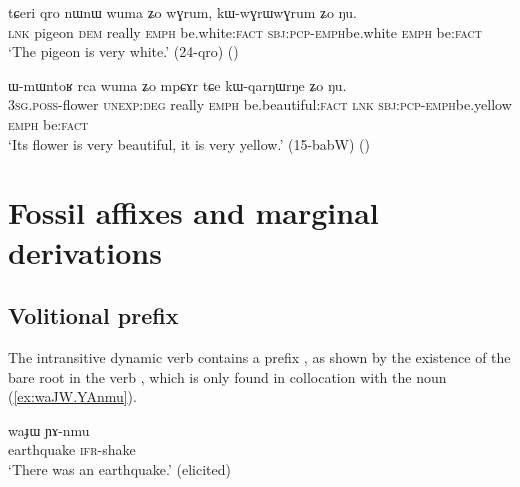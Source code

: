 \begin{exe}
\ex \label{ex:kWwGrWwGrum}
\gll  tɕeri qro nɯnɯ wuma ʑo wɣrum, kɯ-wɣrɯ\redp{}wɣrum ʑo ŋu. \\
\textsc{lnk} pigeon \textsc{dem} really \textsc{emph} be.white:\textsc{fact} \textsc{sbj}:\textsc{pcp}-\textsc{emph}\redp{}be.white \textsc{emph} be:\textsc{fact} \\
\glt `The pigeon is very white.' (24-qro) ()
\end {exe}

\begin{exe}
\ex \label{ex:kWqarNWrNe}
\gll ɯ-mɯntoʁ rca wuma ʑo mpɕɤr tɕe kɯ-qarŋɯ\redp{}rŋe ʑo ŋu. \\
\textsc{3sg}.\textsc{poss}-flower \textsc{unexp}:\textsc{deg} really \textsc{emph} be.beautiful:\textsc{fact} \textsc{lnk} \textsc{sbj}:\textsc{pcp}-\textsc{emph}\redp{}be.yellow \textsc{emph} be:\textsc{fact} \\
\glt `Its flower is very beautiful, it is very yellow.' (15-babW) ()
\end {exe}

\section{Fossil affixes and marginal derivations} \label{sec:marginal.derivations}


\subsection{Volitional  prefix} \label{sec:volitional.mW}
The intransitive dynamic verb  contains a prefix , as shown by the existence of the bare root  in the verb  \citep{jacques17volitional}, which is only found in collocation with the noun  (\ref{ex:waJW.YAnmu}).


\begin{exe}
\ex \label{ex:waJW.YAnmu}
\gll waɟɯ ɲɤ-nmu \\
earthquake \textsc{ifr}-shake \\
\glt `There was an earthquake.' (elicited)
\end{exe}

